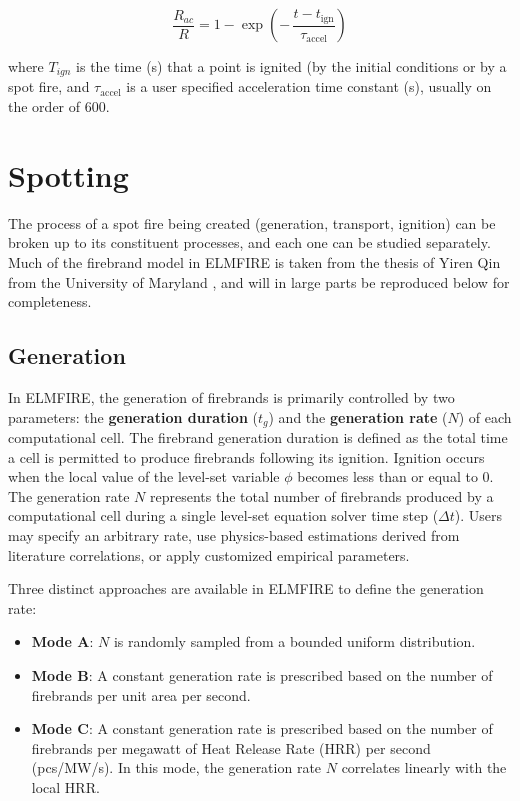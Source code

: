 \[
\frac{R_{ac}}{R}
= 1 - \exp\!\left( -\,\frac{t - t_{\mathrm{ign}}}{\tau_{\mathrm{accel}}} \right)
\]

where $T_{ign}$ is the time (s) that a point is ignited (by the initial conditions or by a spot fire, and $\tau_{\mathrm{accel}}$ is a user specified acceleration time constant (s), usually on the order of 600.

\section{Spotting}

The process of a spot fire being created (generation, transport, ignition) can be broken up to its constituent processes, and each one can be studied separately. Much of the firebrand model in ELMFIRE is taken from the thesis of Yiren Qin from the University of Maryland \cite{qinPhysicsBasedEulerianFramework2025}, and will in large parts be reproduced below for completeness.

\subsection{Generation}

In ELMFIRE, the generation of firebrands is primarily controlled by two parameters: the \textbf{generation duration} ($t_g$) and the \textbf{generation rate} ($N$) of each computational cell. The firebrand generation duration is defined as the total time a cell is permitted to produce firebrands following its ignition. Ignition occurs when the local value of the level-set variable $\phi$ becomes less than or equal to 0. The generation rate $N$ represents the total number of firebrands produced by a computational cell during a single level-set equation solver time step ($\Delta t$). Users may specify an arbitrary rate, use physics-based estimations derived from literature correlations, or apply customized empirical parameters.

Three distinct approaches are available in ELMFIRE to define the generation rate:
\begin{itemize}
    \item \textbf{Mode A}: $N$ is randomly sampled from a bounded uniform distribution.
    \item \textbf{Mode B}: A constant generation rate is prescribed based on the number of firebrands per unit area per second.
    \item \textbf{Mode C}: A constant generation rate is prescribed based on the number of firebrands per megawatt of Heat Release Rate (HRR) per second (pcs/MW/s). In this mode, the generation rate $N$ correlates linearly with the local HRR.
\end{itemize}

